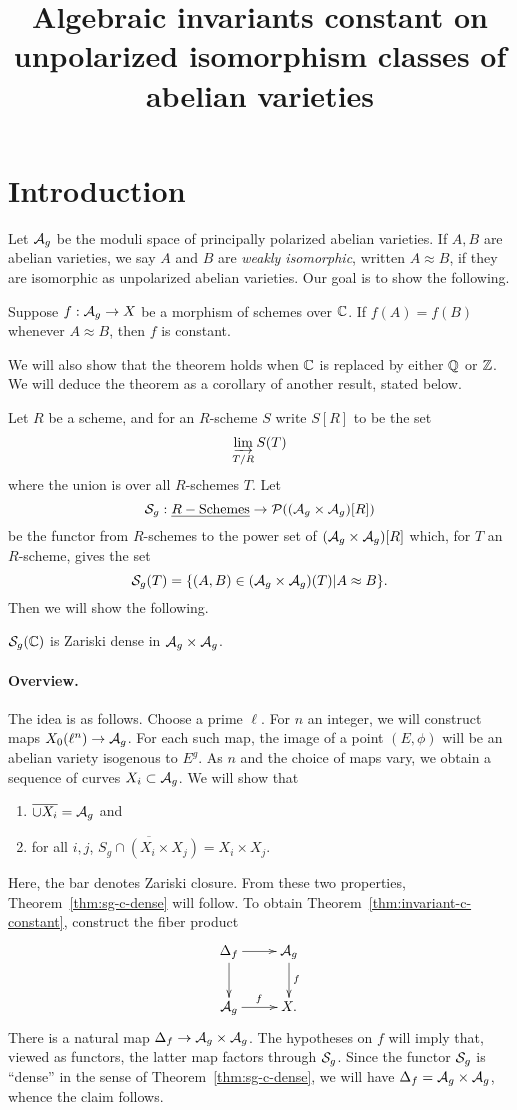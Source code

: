 \documentclass{amsart}
\title[Invariants constant on unpolarized isomorphism classes]{Algebraic invariants constant on unpolarized isomorphism classes of abelian varieties}
\begin{document}
\maketitle

\section{Introduction}
\label{sec:introduction}

Let $\mathcal{A}_g$ be the moduli space of principally polarized abelian varieties. If $A, B$ are abelian varieties, we say $A$ and $B$ are \emph{weakly isomorphic}, written $A \approx B$, if they are isomorphic as unpolarized abelian varieties. Our goal is to show the following.
\begin{theorem}\label{thm:invariant-c-constant}
  Suppose $f: \mathcal{A}_g \to X$ be a morphism of schemes over $\mathbb{C}$. If $f(A) = f(B)$ whenever $A \approx B$, then $f$ is constant.
\end{theorem}
We will also show that the theorem holds when $\mathbb{C}$ is replaced by either $\mathbb{Q}$ or $\mathbb{Z}$. We will deduce the theorem as a corollary of another result, stated below.

Let $R$ be a scheme, and for an $R$-scheme $S$ write $S[R]$ to be the set
\[
  \varinjlim_{T/R} S(T)
\]
where the union is over all $R$-schemes $T$. Let
\[
  \mathcal{S}_g: \underline{R-\textrm{Schemes}} \to \mathcal{P}((\mathcal{A}_g \times \mathcal{A}_g)[R])
\]
be the functor from $R$-schemes to the power set of $(\mathcal{A}_g \times \mathcal{A}_g)[R]$ which, for $T$ an $R$-scheme, gives the set
\[
  \mathcal{S}_g(T) = \{(A,B) \in (\mathcal{A}_g \times \mathcal{A}_g)(T) | A \approx B\}.
\]
Then we will show the following.
\begin{theorem}\label{thm:sg-c-dense}
  $\mathcal{S}_g(\mathbb{C})$ is Zariski dense in $\mathcal{A}_g \times \mathcal{A}_g$.
\end{theorem}

\paragraph{Overview.}

The idea is as follows. Choose a prime $\ell$. For $n$ an integer, we will construct maps $X_0(\ell^n) \to \mathcal{A}_g$. For each such map, the image of a point $(E, \phi)$ will be an abelian variety isogenous to $E^g$. As $n$ and the choice of maps vary, we obtain a sequence of curves $X_i \subset \mathcal{A}_g$. We will show that
\begin{enumerate}
    \item\label{i:curves-dense} $\overline{\cup X_i} = \mathcal{A}_g$ and
    \item\label{i:Sg-dense} for all $i,j$, $\overline{S_g \cap (X_i \times X_j)} = X_i \times X_j$.
\end{enumerate}
Here, the bar denotes Zariski closure. From these two properties, Theorem~\ref{thm:sg-c-dense} will follow. To obtain Theorem~\ref{thm:invariant-c-constant}, construct the fiber product
\[
  \xymatrix{
    \df \ar[r] \ar[d] & \ag \ar[d]^f \\
    \ag \ar[r]^f & X.
  }
\]
There is a natural map $\Delta_f \to \mathcal{A}_g \times \mathcal{A}_g$. The hypotheses on $f$ will imply that, viewed as functors, the latter map factors through $\mathcal{S}_g$. Since the functor $\mathcal{S}_g$ is ``dense'' in the sense of Theorem~\ref{thm:sg-c-dense}, we will have $\Delta_f = \mathcal{A}_g \times \mathcal{A}_g$, whence the claim follows.
\end{document}
